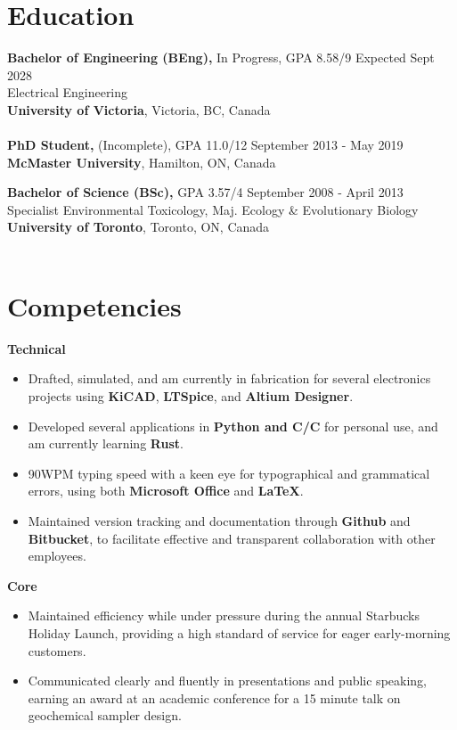 \documentclass[line,margin]{res}
\newcommand{\CC}{C\nolinebreak\hspace{-.05em}\raisebox{.4ex}{\tiny\bf +}\nolinebreak\hspace{-.10em}\raisebox{.4ex}{\tiny\bf +}}
\begin{document}
\address{203-1870 McKenzie Avenue, Victoria BC V8N 4X3}
\address{\href{mailto:mwinlandgaetz@gmail.com}{mwinlandgaetz@gmail.com}\\
(289) 689-0427}

\begin{resume}
\section{Education}
    {\textbf{Bachelor of Engineering (BEng),}} In Progress, GPA 8.58/9 \hfill Expected Sept 2028\\
    Electrical Engineering\\
    \textbf{University of Victoria}, Victoria, BC, Canada \\\\
    \textbf{PhD Student,} (Incomplete), GPA 11.0/12   \hfill September 2013 - May 2019\\
    \textbf{McMaster University}, Hamilton, ON, Canada \hfill 

    {\textbf{Bachelor of Science (BSc),}} GPA 3.57/4 \hfill September 2008 - April 2013\\
    Specialist Environmental Toxicology, Maj. Ecology \& Evolutionary Biology\\
    \textbf{University of Toronto}, Toronto, ON, Canada \\\\

\section{Competencies}
    \textbf{Technical}
    \begin{itemize} \itemsep -2pt
        \item Drafted, simulated, and am currently in fabrication for several electronics projects using \textbf{KiCAD}, \textbf{LTSpice}, and \textbf{Altium Designer}.
        \item Developed several applications in \textbf{Python and C/\CC} for personal use, and am currently learning \textbf{Rust}.
        \item 90WPM typing speed with a keen eye for typographical and grammatical errors, using both \textbf{Microsoft Office} and \textbf{LaTeX}.
        \item Maintained version tracking and documentation through \textbf{Github} and \textbf{Bitbucket}, to facilitate effective and transparent collaboration with other employees.
    \end{itemize}
    \textbf{Core}
    \begin{itemize} \itemsep -2pt
        \item Maintained efficiency while under pressure during the annual Starbucks Holiday Launch, providing a high standard of service for eager early-morning customers.
        \item Communicated clearly and fluently in presentations and public speaking, earning an award at an academic conference for a 15 minute talk on geochemical sampler design.
    \end{itemize}


\end{resume}
\end{document}
